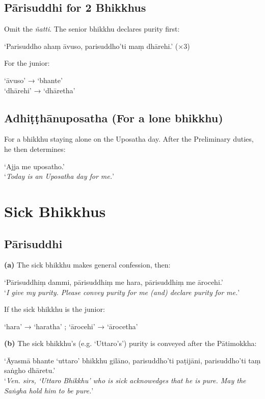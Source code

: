 \subsection{Pārisuddhi for 2 Bhikkhus}

Omit the \emph{ñatti}. The senior bhikkhu declares purity first:

‘Parisuddho ahaṃ āvuso, parisuddho'ti maṃ dhārehi.’ (×3)

For the junior:

‘āvuso’ → ‘bhante’\\
‘dhārehi’ → ‘dhāretha’


\subsection{Adhiṭṭhānuposatha (For a lone bhikkhu)}

For a bhikkhu staying alone on the Uposatha day. After the Preliminary duties,
he then determines:

‘Ajja me uposatho.’\\
‘\emph{Today is an Uposatha day for me.}’ 

\section{Sick Bhikkhus}

\subsection{Pārisuddhi}

\textbf{(a)} The sick bhikkhu makes general confession, then:

‘Pārisuddhiṃ dammi, pārisuddhiṃ me hara, pārisuddhiṃ me ārocehi.’\\
‘\emph{I give my purity. Please convey purity for me (and) declare purity for me.}’

If the sick bhikkhu is the junior:

‘hara’ → ‘haratha’ ; ‘ārocehi’ → ‘ārocetha’


\textbf{(b)} The sick bhikkhu's (e.g. ‘Uttaro's’) purity is conveyed after the
Pātimokkha:

‘Āyasmā bhante ‘uttaro’ bhikkhu gilāno, parisuddho'ti paṭijāni, parisuddho'ti taṃ saṅgho dhāretu.’\\
‘\emph{Ven. sirs, ‘Uttaro Bhikkhu’ who is sick acknowedges that he is pure. May
  the Saṅgha hold him to be pure.}’

